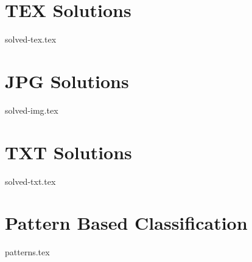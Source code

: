 \documentclass{../latex-setting/cmemoir}
\begin{document}
\frontmatter

\setcounter{tocdepth}{1}
\tableofcontents

\renewcommand\contentsname{Contents(+Hints)}
\newpage
\setcounter{tocdepth}{3}
\tableofcontents



\mainmatter{}

\part{TEX Solutions}
{solved-tex.tex}

\part{JPG Solutions}
{solved-img.tex}

\part{TXT Solutions}
{solved-txt.tex}

\part{Pattern Based Classification}
{patterns.tex}


\end{document}
